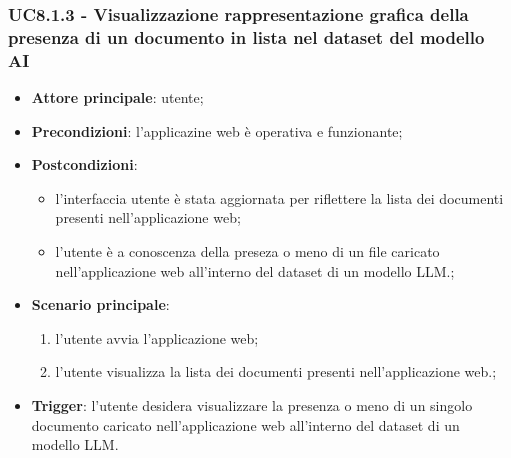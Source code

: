 \documentclass[10pt, a4paper]{article}
\begin{document}
    \subsubsection{UC8.1.3 - Visualizzazione rappresentazione grafica della presenza di un documento in lista nel dataset del modello AI}
    \begin{itemize}
        \item \textbf{Attore principale}: utente;
        \item \textbf{Precondizioni}: l'applicazine web è operativa e funzionante;
        \item \textbf{Postcondizioni}:
        \begin{itemize}
            \item l'interfaccia utente è stata aggiornata per riflettere la lista dei documenti presenti nell'applicazione web;
            \item l'utente è a conoscenza della preseza o meno di un file caricato nell'applicazione web all'interno del dataset di un modello LLM.;
        \end{itemize}
        \item \textbf{Scenario principale}:
        \begin{enumerate}
            \item l'utente avvia l'applicazione web;
            \item l'utente visualizza la lista dei documenti presenti nell'applicazione web.;
        \end{enumerate}
        \item \textbf{Trigger}: l'utente desidera visualizzare la presenza o meno di un singolo documento caricato nell'applicazione web all'interno del dataset di un modello LLM.
    \end{itemize}
        
\end{document}
